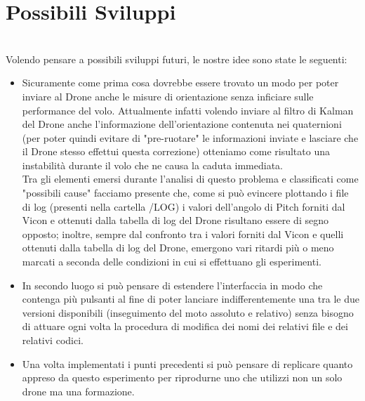 \section*{Possibili Sviluppi}
\\
Volendo pensare a possibili sviluppi futuri, le nostre idee sono state le seguenti: 
\begin{itemize}
    \item Sicuramente come prima cosa dovrebbe essere trovato un modo per poter inviare al Drone anche le misure di orientazione senza inficiare sulle performance del volo. Attualmente infatti volendo inviare al filtro di Kalman del Drone anche l'informazione dell'orientazione contenuta nei quaternioni (per poter quindi evitare di "pre-ruotare" le informazioni inviate e lasciare che il Drone stesso effettui questa correzione) otteniamo come risultato una instabilità durante il volo che ne causa la caduta immediata. 
    \\
    Tra gli elementi emersi durante l'analisi di questo problema e classificati come "possibili cause" facciamo presente che, come si può evincere plottando i file di log (presenti nella cartella /LOG) i valori dell'angolo di Pitch forniti dal Vicon e ottenuti dalla tabella di log del Drone risultano essere di segno opposto; inoltre, sempre dal confronto tra i valori forniti dal Vicon e quelli ottenuti dalla tabella di log del Drone, emergono vari ritardi più o meno marcati a seconda delle condizioni in cui si effettuano gli esperimenti. 
    \item In secondo luogo si può pensare di estendere l'interfaccia in modo che contenga più pulsanti al fine di poter lanciare indifferentemente una tra le due versioni disponibili (inseguimento del moto assoluto e relativo) senza bisogno di attuare ogni volta la procedura di modifica dei nomi dei relativi file e dei relativi codici. 
    \item Una volta implementati i punti precedenti si può pensare di replicare quanto appreso da questo esperimento per riprodurne uno che utilizzi non un solo drone ma una formazione. 
\end{itemize}







